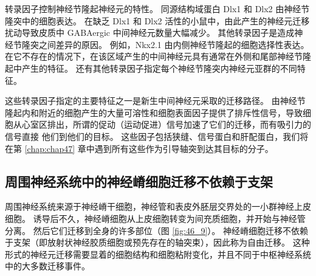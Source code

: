 转录因子控制神经节隆起神经元的特性。 同源结构域蛋白 Dlx1 和 Dlx2 由神经节隆突中的细胞表达。 在缺乏 Dlx1 和 Dlx2 活性的小鼠中，由此产生的神经元迁移扰动导致皮质中 GABAergic 中间神经元数量大幅减少。 其他转录因子是造成神经节隆突之间差异的原因。 例如，Nkx2.1 由内侧神经节隆起的细胞选择性表达。 在它不存在的情况下，在该区域产生的中间神经元具有通常在外侧和尾部神经节隆起中产生的特征。 还有其他转录因子指定每个神经节隆突内神经元亚群的不同特征。

这些转录因子指定的主要特征之一是新生中间神经元采取的迁移路径。 由神经节隆起内和附近的细胞产生的大量可溶性和细胞表面因子提供了排斥性信号，导致细胞从心室区排出，所谓的促动（运动促进）信号加速了它们的迁移，而有吸引力的信号直接 他们到他们的目标。 这些因子包括狭缝、信号蛋白和肝配蛋白，我们将在第 \ref{chap:chap47} 章中遇到所有这些作为引导轴突到达其目标的分子。

\subsection{周围神经系统中的神经嵴细胞迁移不依赖于支架}
周围神经系统来源于神经嵴干细胞，神经管和表皮外胚层交界处的一小群神经上皮细胞。 诱导后不久，神经嵴细胞从上皮细胞转变为间充质细胞，并开始与神经管分离。 然后它们迁移到全身的许多部位（图 \ref{fig:46_9}）。 
神经嵴细胞迁移不依赖于支架（即放射状神经胶质细胞或预先存在的轴突束），因此称为自由迁移。 这种形式的神经元迁移需要显着的细胞结构和细胞粘附变化，并且不同于中枢神经系统中的大多数迁移事件。

